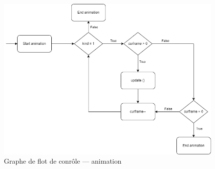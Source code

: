 \documentclass{article}
\begin{document}
\begin{center}
    \begin{figure}[ht]
        \includegraphics[scale=0.5]{img/exec.png}
        \caption{Graphe de flot de conrôle --- animation}
    \end{figure}
\end{center}


\end{document}

